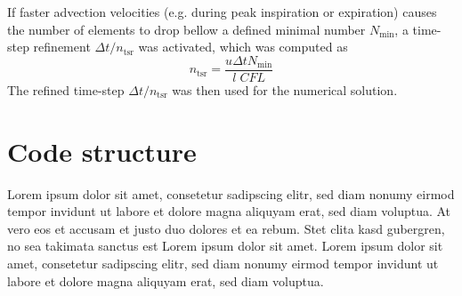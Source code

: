 If faster advection velocities (e.g. during peak inspiration or expiration) causes the number of elements to drop bellow a defined minimal number
$N_\mathrm{min}$, a time-step refinement $\Delta t / n_\mathrm{tsr}$ was activated, which was computed as
\begin{equation}
  n_\mathrm{tsr} = \frac{u \Delta t N_\mathrm{min}}{l\;CFL}
\end{equation}
The refined time-step $\Delta t / n_\mathrm{tsr}$ was then used for the numerical solution.



\section{Code structure} \label{sec:code_structure}
Lorem ipsum dolor sit amet, consetetur sadipscing elitr, sed diam nonumy eirmod tempor invidunt ut labore et dolore magna aliquyam erat, sed diam voluptua. At vero eos et accusam et justo duo dolores et ea rebum. Stet clita kasd gubergren, no sea takimata sanctus est Lorem ipsum dolor sit amet. Lorem ipsum dolor sit amet, consetetur sadipscing elitr, sed diam nonumy eirmod tempor invidunt ut labore et dolore magna aliquyam erat, sed diam voluptua.
